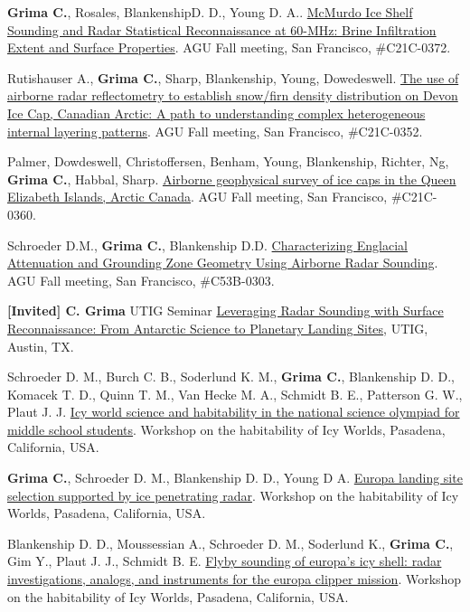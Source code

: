 \begin{etaremune}
\item
  \textbf{Grima C.}, Rosales, BlankenshipD. D., Young D. A..
  \href{https://agu.confex.com/agu/fm14/meetingapp.cgi/Paper/22986}{McMurdo
  Ice Shelf Sounding and Radar Statistical Reconnaissance at 60-MHz:
  Brine Infiltration Extent and Surface Properties}. AGU Fall meeting,
  San Francisco, \#C21C-0372.
\item
  Rutishauser A., \textbf{Grima C.}, Sharp, Blankenship, Young,
  Dowedeswell.
  \href{https://agu.confex.com/agu/fm14/meetingapp.cgi/Paper/17159}{The
  use of airborne radar reflectometry to establish snow/firn density
  distribution on Devon Ice Cap, Canadian Arctic: A path to
  understanding complex heterogeneous internal layering patterns}. AGU
  Fall meeting, San Francisco, \#C21C-0352.
\item
  Palmer, Dowdeswell, Christoffersen, Benham, Young, Blankenship,
  Richter, Ng, \textbf{Grima C.}, Habbal, Sharp.
  \href{https://agu.confex.com/agu/fm14/meetingapp.cgi/Paper/15672}{Airborne
  geophysical survey of ice caps in the Queen Elizabeth Islands, Arctic
  Canada}. AGU Fall meeting, San Francisco, \#C21C-0360.
\item
  Schroeder D.M., \textbf{Grima C.}, Blankenship D.D.
  \href{https://agu.confex.com/agu/fm14/meetingapp.cgi/Paper/8154}{Characterizing
  Englacial Attenuation and Grounding Zone Geometry Using Airborne Radar
  Sounding}. AGU Fall meeting, San Francisco, \#C53B-0303.
\item
  \textbf{{[}Invited{]} C. Grima} UTIG Seminar
  \href{http://mediasite.jsg.utexas.edu/UTMediasite/Play/7b4636e8db6844d79de9e32a14f142781d}{Leveraging
  Radar Sounding with Surface Reconnaissance: From Antarctic Science to
  Planetary Landing Sites}, UTIG, Austin, TX.
\item
  Schroeder D. M., Burch C. B., Soderlund K. M., \textbf{Grima C.},
  Blankenship D. D., Komacek T. D., Quinn T. M., Van Hecke M. A.,
  Schmidt B. E., Patterson G. W., Plaut J. J. \href{https://www.lpi.usra.edu/lpi/contribution_docs/LPI-001774.pdf}{Icy world science and
  habitability in the national science olympiad for middle school
  students}. Workshop on the habitability of Icy Worlds, Pasadena,
  California, USA.
\item
  \textbf{Grima C.}, Schroeder D. M., Blankenship D. D., Young D A.
  \href{https://www.lpi.usra.edu/lpi/contribution_docs/LPI-001774.pdf}{Europa landing site selection supported by ice penetrating radar}.
  Workshop on the habitability of Icy Worlds, Pasadena, California, USA.
\item
  Blankenship D. D., Moussessian A., Schroeder D. M., Soderlund K.,
  \textbf{Grima C.}, Gim Y., Plaut J. J., Schmidt B. E. \href{https://www.lpi.usra.edu/lpi/contribution_docs/LPI-001774.pdf}{Flyby sounding
  of europa's icy shell: radar investigations,
  analogs, and instruments for the europa clipper mission}. Workshop on
  the habitability of Icy Worlds, Pasadena, California, USA.


\end{etaremune}

